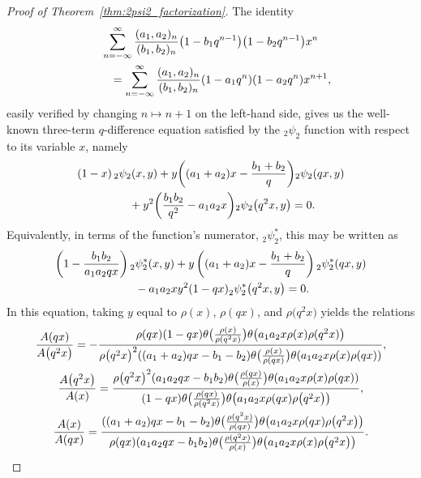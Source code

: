 \documentclass[pdftex]{sigma}
\numberwithin{equation}{section}
\begin{document}
\begin{proof}[Proof of Theorem~\ref{thm:2psi2_factorization}]
The identity
\begin{gather}
\sum_{n=-\infty}^\infty {(a_1,a_2)_n \over (b_1,b_2)_n} \bigl(1-b_1q^{n-1}\bigr)\bigl(1-b_2q^{n-1}\bigr) x^n\nonumber\\
\qquad = \sum_{n=-\infty}^\infty {(a_1,a_2)_n \over (b_1,b_2)_n} (1-a_1q^n)(1-a_2q^n) x^{n+1},\label{eqn:elementary_2psi2_shift}
\end{gather}
easily verified by changing $n \mapsto n+1$ on the left-hand side, gives us the well-known three-term $q$-difference equation satisfied by the $_2\psi_2$ function with respect to its variable $x$, namely
\begin{gather*}
 (1-x)\,{}_2\psi_2(x,y) + y\bigg( (a_1+a_2)x - {b_1+b_2 \over q} \bigg) {}_2\psi_2(qx,y) \\
 \qquad{} + y^2 \bigg( {b_1b_2 \over q^2} - a_1a_2x \bigg) {}_2\psi_2\bigl(q^2x,y\bigr)
 =0.
 \end{gather*}
Equivalently, in terms of the function's numerator, ${}_2^{}\psi_2^\ast$, this may be written as
\begin{gather}
\left(1-{b_1b_2 \over a_1a_2qx}\right){}_2^{}\psi_2^\ast(x,y) + y\left( (a_1+a_2)x - {b_1+b_2 \over q} \right) {}_2^{}\psi_2^\ast(qx,y)\nonumber \\
\qquad{}-a_1a_2xy^2 (1-qx) {}_2^{}\psi_2^\ast\bigl(q^2x,y\bigr) =0.\label{eqn:2psi2ast_functional_eqn_wrt_x}
\end{gather}
In this equation, taking $y$ equal to $\rho(x)$, $\rho(qx)$, and $\rho\bigl(q^2x\bigr)$ yields the relations
\begin{gather}
{A(qx) \over A\bigl(q^2x\bigr)} = -{\rho(qx)(1-qx)\theta\bigl({\rho(x) \over \rho(q^2x)}\bigr) \theta\bigl(a_1a_2x\rho(x)\rho(q^2x)\bigr) \over \rho\bigl(q^2x\bigr)^2 ((a_1+a_2)qx-b_1-b_2)\theta\bigl({\rho(x) \over \rho(qx)}\bigr) \theta(a_1a_2x\rho(x)\rho(qx))}, \label{eqn:A_rho_relation_1} \\
{A\bigl(q^2x\bigr) \over A(x)} = {\rho\bigl(q^2x\bigr)^2 (a_1a_2qx-b_1b_2) \theta\bigl({\rho(qx) \over \rho(x)}\bigr) \theta(a_1a_2x\rho(x)\rho(qx)) \over (1-qx)\theta\bigl({\rho(qx) \over \rho(q^2x)}\bigr) \theta\bigl(a_1a_2x\rho(qx)\rho\bigl(q^2x\bigr)\bigr)}, \label{eqn:A_rho_relation_2} \\
{A(x) \over A(qx)} = {((a_1+a_2)qx-b_1-b_2) \theta\bigl({\rho(q^2x) \over \rho(qx)}\bigr) \theta\bigl(a_1a_2x\rho(qx)\rho\bigl(q^2x\bigr)\bigr) \over \rho(qx) (a_1a_2qx-b_1b_2)\theta\bigl({\rho(q^2x) \over \rho(x)}\bigr) \theta\bigl(a_1a_2x\rho(x)\rho\bigl(q^2x\bigr)\bigr)}. \label{eqn:A_rho_relation_3}

\end{gather}
\end{proof}
\end{document}
